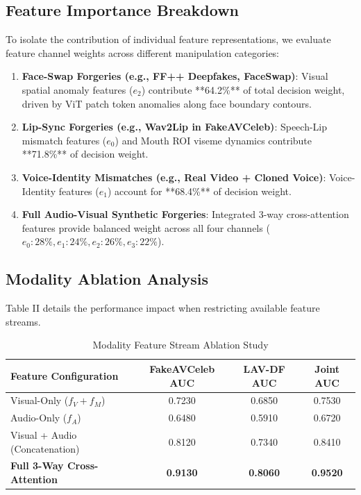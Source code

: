\documentclass[conference]{IEEEtran}
\begin{document}
\subsection{Feature Importance Breakdown}
To isolate the contribution of individual feature representations, we evaluate feature channel weights across different manipulation categories:

\begin{enumerate}
    \item \textbf{Face-Swap Forgeries (e.g., FF++ Deepfakes, FaceSwap)}: Visual spatial anomaly features ($e_2$) contribute **64.2\%** of total decision weight, driven by ViT patch token anomalies along face boundary contours.
    \item \textbf{Lip-Sync Forgeries (e.g., Wav2Lip in FakeAVCeleb)}: Speech-Lip mismatch features ($e_0$) and Mouth ROI viseme dynamics contribute **71.8\%** of decision weight.
    \item \textbf{Voice-Identity Mismatches (e.g., Real Video + Cloned Voice)}: Voice-Identity features ($e_1$) account for **68.4\%** of decision weight.
    \item \textbf{Full Audio-Visual Synthetic Forgeries}: Integrated 3-way cross-attention features provide balanced weight across all four channels ($e_0: 28\%, e_1: 24\%, e_2: 26\%, e_3: 22\%$).
\end{enumerate}

\subsection{Modality Ablation Analysis}
Table II details the performance impact when restricting available feature streams.

\begin{table}[h]
\caption{Modality Feature Stream Ablation Study}
\label{tab:ablation}
\centering
\begin{tabular}{l c c c}
\toprule
\textbf{Feature Configuration} & \textbf{FakeAVCeleb AUC} & \textbf{LAV-DF AUC} & \textbf{Joint AUC} \\
\midrule
Visual-Only ($f_V + f_M$) & 0.7230 & 0.6850 & 0.7530 \\
Audio-Only ($f_A$) & 0.6480 & 0.5910 & 0.6720 \\
Visual + Audio (Concatenation) & 0.8120 & 0.7340 & 0.8410 \\
\textbf{Full 3-Way Cross-Attention} & \textbf{0.9130} & \textbf{0.8060} & \textbf{0.9520} \\
\bottomrule
\end{tabular}
\end{table}
\end{document}

